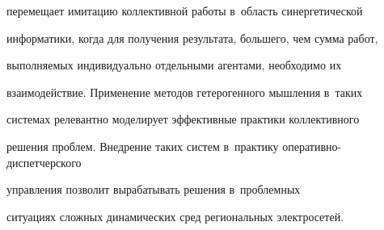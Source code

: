 перемещает имитацию коллективной работы в~область синергетической 


информатики, когда для получения результата, большего, чем сумма работ, 


выполняемых индивидуально отдельными агентами, необходимо их 


взаимодействие. Применение методов гетерогенного мышления в~таких 


системах релевантно моделирует эффективные практики коллективного 


решения проб\-лем. Внедрение таких систем в~практику опе\-ра\-тив\-но-дис\-пет\-чер\-ско\-го 


управ\-ле\-ния позволит вырабатывать решения в~проблемных 


ситуациях сложных динамических сред региональных электросетей.


  


